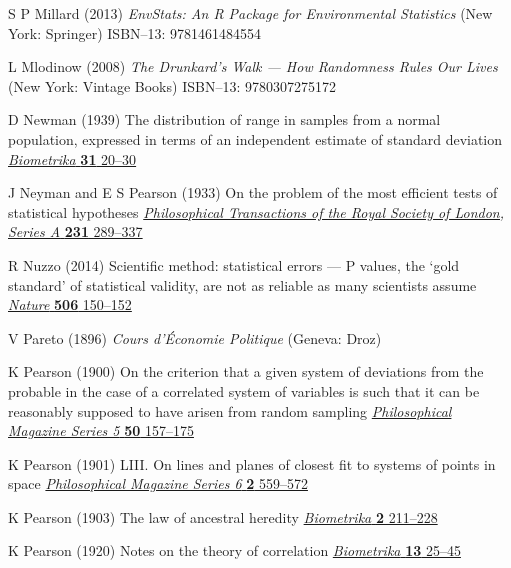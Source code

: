 \begin{thebibliography}{99}
S P Millard
(2013) \textit{EnvStats: An R Package for Environmental Statistics}
(New York: Springer)
ISBN--13: 9781461484554

L Mlodinow
(2008) \textit{The Drunkard's Walk --- How Randomness Rules Our 
Lives}
(New York: Vintage Books)
ISBN--13: 9780307275172

D Newman
(1939) The distribution of range in samples from a normal 
population, expressed in terms of an independent estimate of 
standard deviation
\href{http://dx.doi.org/10.1093/biomet/31.1-2.20}{\textit{Biometrika}
\textbf{31} 20--30}

J Neyman and E S Pearson
(1933) On the problem of the most efficient tests of statistical 
hypotheses
\href{http://dx.doi.org/10.1098/rsta.1933.0009}{\textit{Philosophical Transactions of the Royal Society of London, 
Series A} \textbf{231} 289--337}

R Nuzzo
(2014) Scientific method: statistical errors --- P values, the 
`gold standard' of statistical validity, are not as reliable as 
many scientists assume
\href{https://doi.org/10.1038/506150a}{\textit{Nature} \textbf{506} 
150--152}

V Pareto
(1896) \textit{Cours d'\'{E}conomie Politique} (Geneva: Droz)

K Pearson
(1900) On the criterion that a given system of deviations from the 
probable in the case of a correlated system of variables is such 
that it can be reasonably supposed to have arisen from random 
sampling
\href{http://dx.doi.org/10.1080/14786440009463897}{\textit{Philosophical Magazine Series 5} \textbf{50} 157--175}

K Pearson
(1901) LIII. On lines and planes of closest fit to systems of 
points in space
\href{http://dx.doi.org/10.1080/14786440109462720}{\textit{Philosophical Magazine Series 6} \textbf{2} 559--572}

K Pearson
(1903) The law of ancestral heredity
\href{https://doi.org/10.1093/biomet/2.2.211}{\textit{Biometrika} 
\textbf{2} 211--228}

K Pearson
(1920) Notes on the theory of correlation
\href{https://doi.org/10.1093/biomet/13.1.25}{\textit{Biometrika} 
\textbf{13} 25--45}


\end{thebibliography}
